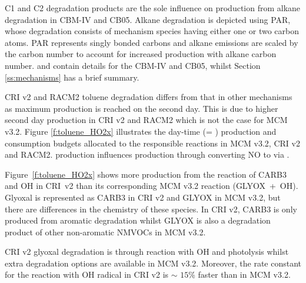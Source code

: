 C1 and C2 degradation products are the sole influence on  production from alkane degradation in CBM-IV and CB05.
Alkane degradation is depicted using PAR, whose degradation consists of mechanism species having either one or two carbon atoms.
PAR represents singly bonded carbons and alkane emissions are scaled by the carbon number to account for increased  production with alkane carbon number.
\citet{Hogo:1989} and \citet{Yarwood:2005} contain details for the CBM-IV and CB05, whilst Section \ref{ss:mechanisms} has a brief summary.

CRI v2 and RACM2 toluene degradation differs from that in other mechanisms as maximum  production is reached on the second day. 
This is due to higher second day  production in CRI v2 and RACM2 which is not the case for MCM v3.2.  
Figure \ref{f:toluene_HO2x} illustrates the day-time  (= ) production and consumption budgets allocated to the responsible reactions in MCM v3.2, CRI v2 and RACM2. 
 production influences  production through  converting NO to  via .

\mbox{Figure \ref{f:toluene_HO2x}} shows more  production from the reaction of CARB3 and OH in \mbox{CRI v2} than its corresponding MCM v3.2 reaction (\mbox{GLYOX + OH}).  
Glyoxal is represented as CARB3 in CRI v2 and GLYOX in MCM v3.2, but there are differences in the chemistry of these species.
In CRI v2, CARB3 is only produced from aromatic degradation whilst GLYOX is also a degradation product of other non-aromatic NMVOCs in MCM v3.2. 

CRI v2 glyoxal degradation is through reaction with OH and photolysis whilst extra degradation options are available in MCM v3.2. 
Moreover, the rate constant for the reaction with OH radical in CRI v2 is $\sim$ $15$\% faster than in MCM v3.2. 

